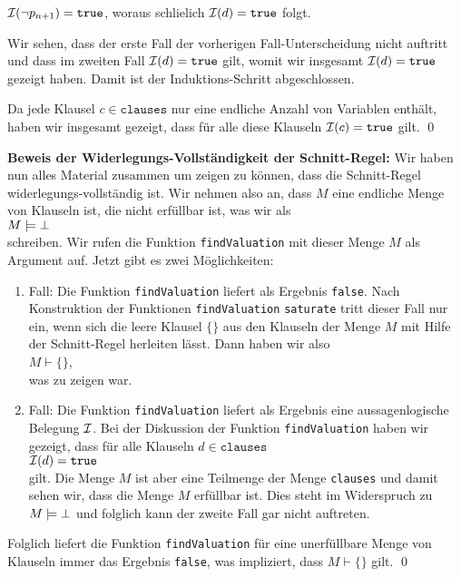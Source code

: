 \begin{enumerate}
\begin{enumerate}
\begin{enumerate}
                         $\mathcal{I}(\neg p_{n+1}) = \mathtt{true}$, woraus schlie\3lich $\mathcal{I}(d) = \mathtt{true}$ folgt.
                   \end{enumerate}
                   Wir sehen, dass der erste Fall der vorherigen Fall-Unterscheidung nicht
                   auftritt und dass im zweiten Fall $\mathcal{I}(d) = \mathtt{true}$ gilt, womit wir insgesamt 
                   $\mathcal{I}(d) = \mathtt{true}$ gezeigt haben.  Damit ist der Induktions-Schritt
                   abgeschlossen.
             \end{enumerate}
             Da jede Klausel $c \in \mathtt{clauses}$ nur eine endliche Anzahl von Variablen
             enth\"{a}lt, haben wir insgesamt gezeigt, dass f\"{u}r alle diese Klauseln 
             $\mathcal{I}(c) = \mathtt{true}$ gilt. \qed
\end{enumerate}

\noindent
\textbf{Beweis der Widerlegungs-Vollst\"{a}ndigkeit der Schnitt-Regel:}
Wir haben nun alles Material zusammen um zeigen zu k\"{o}nnen, dass die Schnitt-Regel
widerlegungs-vollst\"{a}ndig ist.  Wir nehmen also an, dass $M$ eine endliche Menge von Klauseln ist,  die nicht
erf\"{u}llbar ist, was wir als
\\[0.2cm]
\hspace*{1.3cm}
$M \models \bot$ 
\\[0.2cm]
schreiben.  Wir rufen die Funktion \texttt{findValuation} mit dieser Menge $M$ als Argument auf.
Jetzt gibt es zwei M\"{o}glichkeiten:
\begin{enumerate}
\item Fall: Die Funktion \texttt{findValuation} liefert als Ergebnis \texttt{false}.  Nach
      Konstruktion der Funktionen \texttt{findValuation} \texttt{saturate} tritt dieser Fall nur
      ein, wenn sich die leere Klausel $\{\}$ aus den Klauseln der Menge $M$ mit Hilfe der
      Schnitt-Regel herleiten l\"{a}sst.  Dann haben wir also
      \\[0.2cm]
      \hspace*{1.3cm}
      $M \vdash \{\}$,
      \\[0.2cm]
      was zu zeigen war.
\item Fall: Die Funktion \texttt{findValuation} liefert als Ergebnis eine aussagenlogische Belegung
      $\mathcal{I}$.  Bei der Diskussion der Funktion \texttt{findValuation} haben wir gezeigt, dass f\"{u}r
      alle Klauseln $d \in \mathtt{clauses}$
      \\[0.2cm]
      \hspace*{1.3cm}
      $\mathcal{I}(d) = \mathtt{true}$
      \\[0.2cm]
      gilt.  Die Menge $M$ ist aber eine Teilmenge der Menge \texttt{clauses} und damit sehen wir, dass die
      Menge $M$ erf\"{u}llbar ist.  Dies steht im Widerspruch zu $M \models \bot$ und folglich kann der
      zweite Fall gar nicht auftreten. 
\end{enumerate}
Folglich liefert die Funktion \texttt{findValuation} f\"{u}r eine unerf\"{u}llbare Menge von Klauseln immer
das Ergebnis \texttt{false}, was impliziert, dass $M \vdash \{\}$ gilt.  \qed


